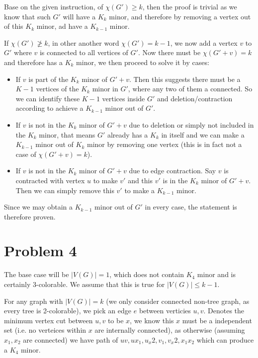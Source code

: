 \documentclass[11pt]{article}
\begin{document}
Base on the given instruction, of $\chi(G') \geq k$, then the proof is trivial as we know that such $G'$ will have a $K_k$ minor, and therefore by removing a vertex out of this $K_k$ minor, ad have a $K_{k-1}$ minor.

If $\chi(G') \not \geq k$, in other another word  $\chi(G') = k-1$, we now add a vertex $v$ to $G'$ where $v$ is connected to all vertices of $G'$. Now there must be $\chi(G' + v) = k$ and therefore has a $K_k$ minor, we then proceed to solve it by cases:

\begin{itemize}
    \item If $v$ is part of the $K_k$ minor of $G' + v$. Then this suggests there must be a $K-1$ vertices of the $K_k$ minor in $G'$, where any two of them a connected. So we can identify these $K-1$ vertices inside $G'$ and deletion/contraction according to achieve a $K_{k-1}$ minor out of $G'$.
    \item If $v$ is not in the $K_k$ minor of $G' + v$ due to deletion or simply not included in the $K_k$ minor, that means $G'$ already has a $K_k$ in itself and we can make a $K_{k-1}$ minor out of $K_k$ minor by removing one vertex (this is in fact not a case of $\chi(G' + v) = k$).
    \item If $v$ is not in the $K_k$ minor of $G' + v$ due to edge contraction. Say $v$ is contracted with vertex $u$ to make $v'$ and this $v'$ is in the $K_k$ minor of $G' + v$. Then we can simply remove this $v'$ to make a $K_{k-1}$ minor.
\end{itemize}

Since we may obtain a $K_{k-1}$ minor out of $G'$ in every case, the statement is therefore proven.

\section*{Problem 4}


The base case will be $|V(G)|=1$, which does not contain $K_4$ minor and is certainly 3-colorable. We assume that this is true for $|V(G)| \leq k-1$.\newline

For any graph with $|V(G)| = k$ (we only consider connected non-tree graph, as every tree is 2-colorable), we pick an edge $e$ between verticies $u, v$. Denotes the minimum vertex cut between $u, v$ to be $x$, we know this $x$ must be a independent set (i.e. no verteices within $x$ are internally connected), as otherwise (assuming $x_1, x_2$ are connected) we have path of $uv, ux_1, u_x2, v_1, v_x2, x_1 x_2$ which can produce a $K_4$ minor.
\end{document}
